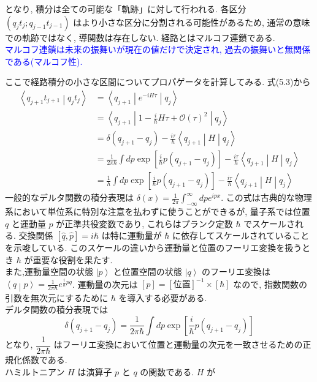\documentclass[a4paper,12pt]{article}
\newcommand{\ket}[1]{\left|#1\right\rangle}
\newcommand{\braket}[2]{\left\langle #1\middle|#2\right\rangle}
\newcommand{\brakets}[3]{\left\langle #1\middle| #2 \middle|#3 \right\rangle}
\begin{document}
となり, 積分は全ての可能な「軌跡」に対して行われる. 各区分 $(q_{j}t_{j}; q_{j-1}t_{j-1})$ はより小さな区分に分割される可能性があるため, 通常の意味での軌跡ではなく, 導関数は存在しない. 経路とはマルコフ連鎖である.\\
\textcolor{blue}{マルコフ連鎖は未来の振舞いが現在の値だけで決定され, 過去の振舞いと無関係である(マルコフ性).}\par
ここで経路積分の小さな区間についてプロパゲータを計算してみる. 式(5.3)から
\begin{align*}
    \braket{q_{j+1}t_{j+1}}{q_{j}t_{j}} &= \brakets{q_{j+1}}{e^{-iH\tau}}{q_{j}}\\
    &= \brakets{q_{j+1}}{1 - \frac{i}{\hbar}H\tau + \mathcal{O}(\tau)^{2}}{q_{j}}\\
    &= \delta(q_{j+1} - q_{j}) - \frac{i\tau}{\hbar}\brakets{q_{j+1}}{H}{q_{j}}\\
    &= \frac{1}{2\pi\hbar}\int dp \exp\left[ \frac{i}{\hbar}p(q_{j+1} - q_{j}) \right] - \frac{i\tau}{\hbar}\brakets{q_{j+1}}{H}{q_{j}} \tag{5.7}\\
    &= \frac{1}{h}\int dp \exp\left[ \frac{i}{\hbar}p(q_{j+1} - q_{j}) \right] - \frac{i\tau}{\hbar}\brakets{q_{j+1}}{H}{q_{j}}
\end{align*}
\color{blue}
一般的なデルタ関数の積分表現は $\displaystyle \delta(x) = \frac{1}{2\pi}\int_{-\infty}^{\infty}dp e^{ipx}$. この式は古典的な物理系において単位系に特別な注意を払わずに使うことができるが, 量子系では位置 $q$ と運動量 $p$ が正準共役変数であり, これらはプランク定数 $\hbar$ でスケールされる. 交換関係 $[\hat{q}, \hat{p}] = i\hbar$ は特に運動量が $\hbar$ に依存してスケールされていることを示唆している. このスケールの違いから運動量と位置のフーリエ変換を扱うとき $\hbar$ が重要な役割を果たす.\\
また,運動量空間の状態 $\ket{p}$ と位置空間の状態 $\ket{q}$ のフーリエ変換は $\displaystyle \braket{q}{p} = \frac{1}{2\pi\hbar}e^{\frac{i}{\hbar}pq}$. 運動量の次元は $[p] = [\textrm{位置}]^{-1} \times [\hbar]$ なので, 指数関数の引数を無次元にするために $\hbar$ を導入する必要がある.\\
デルタ関数の積分表現では
\begin{equation*}
    \delta(q_{j+1} - q_{j}) = \frac{1}{2\pi\hbar}\int dp \exp\left[ \frac{i}{\hbar}p(q_{j+1} - q_{j}) \right]
\end{equation*}
となり, $\dfrac{1}{2\pi\hbar}$ はフーリエ変換において位置と運動量の次元を一致させるための正規化係数である. \\
\color{black}
ハミルトニアン $H$ は演算子 $p$ と $q$ の関数である. $H$ が
\end{document}
